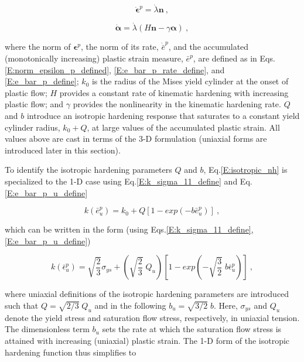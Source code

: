 \documentclass[11pt]{report}
\numberwithin{equation}{section}
\newcommand{\bmf } {\boldsymbol }
\begin{document}
\begin{equation}\label{E:normal_flow_nh}
\dot{\bmf{\epsilon}}^p=\dot{\lambda}\bmf{n}~,
\end{equation}

\begin{equation} \label{E:kinematic_nh}
\dot{\bmf{\alpha}}=\dot{\lambda} \left( H\bmf{n} -\gamma \bmf{\alpha} \right)~,
\end{equation}

\noindent where the norm of $\bmf \epsilon^p$, the norm of its rate, 
$\dot{\bar e}^p$, and the
accumulated (monotonically increasing) plastic strain
measure, $\bar e^p$, are defined as in Eqs.\;\eqref{E:norm_epsilon_p_defined},
\eqref{E:e_bar_p_rate_define}, and \eqref{E:e_bar_p_define};
$k_0$ is the radius of the Mises yield cylinder 
at the onset of plastic flow; $H$ provides a constant rate of kinematic
hardening with increasing plastic flow; and $\gamma$ provides the nonlinearity
in the kinematic hardening rate. $Q$ and $b$ introduce an isotropic 
hardening response that saturates to a constant yield cylinder
radius, $k_0 + Q$, at
large values of the accumulated plastic strain. All values above are cast in terms 
of the 3-D formulation (uniaxial forms are introduced later in this section). 

To identify the isotropic hardening parameters $Q$ and $b$, 
Eq.\;\eqref{E:isotropic_nh} 
is specialized to the 1-D case using Eq.\;\eqref{E:k_sigma_11_define} 
and Eq.\;\eqref{E:e_bar_p_u_define}

\begin{equation}
k(\bar e^p_u) = k_0 + Q\left [ 1- exp \left( -b \bar e^p_u \right) \right ]~,
\end{equation}

\noindent which can be written in the form (using Eqs.\;\eqref{E:k_sigma_11_define},
\eqref{E:e_bar_p_u_define})

\begin{equation}
k(\bar \epsilon^p_u) = \sqrt{\textstyle {\frac{2}{3}}} \sigma_{ys} + 
\left(\sqrt{\textstyle {\frac{2}{3}}}\; Q_u \right)
\left[ 1- exp \left( -\sqrt{\textstyle {\frac{3}{2}}}\;b \bar \epsilon^p_u \right) \right ]~,
\end{equation}

\noindent where uniaxial definitions of the isotropic hardening parameters are
introduced such that
$Q=\sqrt{2/3}\;Q_u$ and in the following $b_u = \sqrt{3/2}\;b$. Here, $\sigma_{ys}$
and $Q_u$ denote the yield stress and saturation flow stress, respectively,
in uniaxial tension. The dimensionless term $b_u$ sets the rate at 
which the saturation flow stress is
attained with increasing (uniaxial) plastic strain. The 1-D form of the isotropic hardening 
function thus simplifies to 
\end{document}

